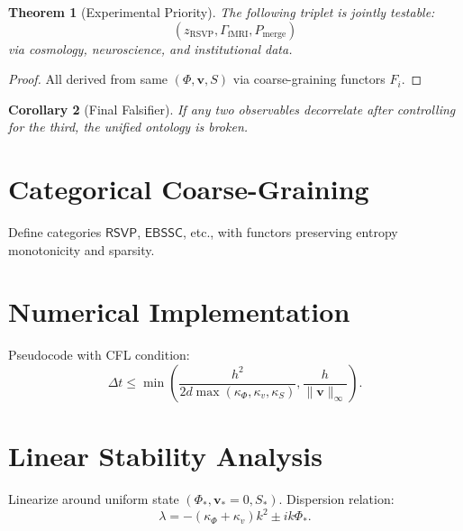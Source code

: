 \documentclass[11pt]{article}
\newtheorem{theorem}{Theorem}[section]
\newtheorem{corollary}[theorem]{Corollary}
\theoremstyle{definition}
\theoremstyle{remark}
\newcommand{\vect}[1]{\bm{#1}}
\begin{document}
\begin{theorem}[Experimental Priority]
The following triplet is jointly testable:
\[
(z_{\mathrm{RSVP}}, \Gamma_{\mathrm{fMRI}}, P_{\mathrm{merge}})
\]
via cosmology, neuroscience, and institutional data.
\end{theorem}

\begin{proof}
All derived from same $(\Phi,\vect{v},S)$ via coarse-graining functors $F_i$.
\end{proof}

\begin{corollary}[Final Falsifier]
If any two observables decorrelate after controlling for the third, the unified ontology is broken.
\end{corollary}



\appendix

\section{Categorical Coarse-Graining}
Define categories $\mathsf{RSVP}$, $\mathsf{EBSSC}$, etc., with functors preserving entropy monotonicity and sparsity.

\section{Numerical Implementation}
Pseudocode with CFL condition:
\[
\Delta t \le \min\left( \frac{h^2}{2d \max(\kappa_\Phi,\kappa_v,\kappa_S)}, \frac{h}{\|\vect{v}\|_\infty} \right).
\]

\section{Linear Stability Analysis}
Linearize around uniform state $(\Phi_*,\vect{v}_*=0,S_*)$. Dispersion relation:
\[
\lambda = -(\kappa_\Phi + \kappa_v) k^2 \pm i k \Phi_*.
\]




\end{document}
